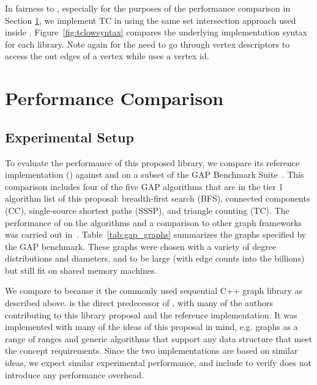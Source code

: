 In fairness to \bgl, especially for the purposes of the performance comparison
in Section \ref{performance}, we implement TC in \bgl using the same set
intersection approach used inside \stdgraph.
Figure~\ref{fig:tclowsyntax} compares the underlying implementation syntax
for each library.
Note again for \bgl the need to go through vertex descriptors to access the out
edges of a vertex while \stdgraph uses a vertex id.

\clearpage

\section{Performance Comparison} \label{performance}
\subsection{Experimental Setup}
To evaluate the performance of this proposed library, we compare its reference implementation
(\stdgraph) against \bgl and \nwgraph on a subset of the GAP Benchmark Suite~\cite{beamer2015gap}.
This comparison includes four of the five GAP algorithms that are in the tier 1 algorithm list of this proposal:
breadth-first search (BFS), connected components (CC), single-source shortest paths (SSSP), 
and triangle counting (TC).  The performance of \nwgraph on the algorithms and a comparison to other
graph frameworks was carried out in~\cite{gapbs_2023}.
Table~\ref{tab:gap_graphs} summarizes the graphs specified by the GAP benchmark.
These graphs were chosen with a variety of degree distributions and diameters, and to be large (with edge counts into the billions) but still fit on shared memory machines.

We compare to \bgl because it the commonly used sequential C++ graph library as described above.
\nwgraph is the direct predecessor of \stdgraph, with many of the \nwgraph authors contributing to this library proposal and the \stdgraph reference implementation.
It was implemented with many of the ideas of this proposal in mind, e.g. graphs as a range of ranges and generic algorithms that support any data structure that meet the concept requirements.
Since the two implementations are based on similar ideas, we expect similar experimental performance, and include \nwgraph to verify \stdgraph does not introduce any performance overhead.

